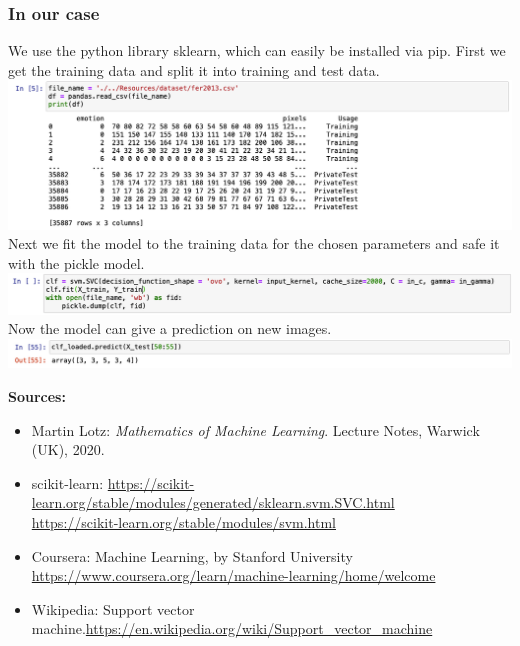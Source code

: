 \subsubsection{In our case}
We use the python library sklearn, which can easily be installed via pip.
First we get the training data and split it into training and test data.\\
\includegraphics[scale=0.4]{Images/trainingdata.png} \\
Next we fit the model to the training data for the chosen parameters and safe it with the pickle model. \\
\includegraphics[scale=0.4]{Images/trainmodel.png} \\
Now the model can give a prediction on new images. \\
\includegraphics[scale=0.4]{Images/svm_prediction.png}

\textbf{Sources:}
\begin{itemize}
\item Martin Lotz: \textit{Mathematics of Machine Learning}. Lecture Notes, Warwick (UK), 2020.
\item scikit-learn: \hyperlink{https://scikit-learn.org/stable/modules/generated/sklearn.svm.SVC.html}{https://scikit-learn.org/stable/modules/generated/sklearn.svm.SVC.html} \\
\hyperlink{https://scikit-learn.org/stable/modules/svm.html}{https://scikit-learn.org/stable/modules/svm.html}
\item Coursera: Machine Learning, by Stanford University \\ \hyperlink{https://www.coursera.org/learn/machine-learning/home/welcome}{https://www.coursera.org/learn/machine-learning/home/welcome}
\item Wikipedia: Support vector machine.\hyperlink{https://en.wikipedia.org/wiki/Support\_vector\_machine}{https://en.wikipedia.org/wiki/Support\_vector\_machine}
\end{itemize}




\newpage